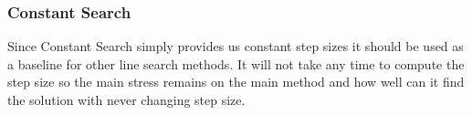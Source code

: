 \documentclass[a4paper,english,titlepage,12pt]{article}
\begin{document}

\subsubsection{Constant Search}

Since Constant Search simply provides us constant step sizes it should be used as a baseline for other line search methods. It will not take any time to compute the step size so the main stress remains on the main method and how well can it find the solution with never changing step size.

\end{document}
